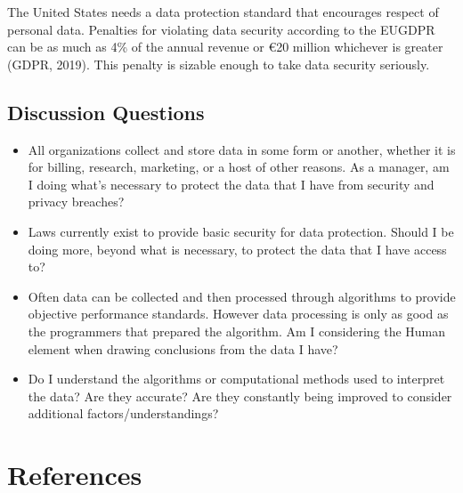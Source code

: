 \documentclass[]{book}
\theoremstyle{definition}
\theoremstyle{definition}
\theoremstyle{definition}
\theoremstyle{remark}
\begin{document}
The United States needs a data protection standard that encourages
respect of personal data. Penalties for violating data security
according to the EUGDPR can be as much as 4\% of the annual revenue or
€20 million whichever is greater (GDPR, 2019). This penalty is sizable
enough to take data security seriously.

\hypertarget{discussion-questions-3}{%
\subsection{Discussion Questions}\label{discussion-questions-3}}

\begin{itemize}
\item
  All organizations collect and store data in some form or another,
  whether it is for billing, research, marketing, or a host of other
  reasons. As a manager, am I doing what's necessary to protect the data
  that I have from security and privacy breaches?
\item
  Laws currently exist to provide basic security for data protection.
  Should I be doing more, beyond what is necessary, to protect the data
  that I have access to?
\item
  Often data can be collected and then processed through algorithms to
  provide objective performance standards. However data processing is
  only as good as the programmers that prepared the algorithm. Am I
  considering the Human element when drawing conclusions from the data I
  have?
\item
  Do I understand the algorithms or computational methods used to
  interpret the data? Are they accurate? Are they constantly being
  improved to consider additional factors/understandings?
\end{itemize}

\hypertarget{references-3}{%
\section{References}\label{references-3}}
\end{document}
